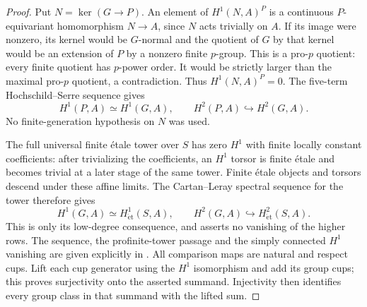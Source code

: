 \documentclass[11pt]{article}
\theoremstyle{definition}
\numberwithin{equation}{section}
\begin{document}
\begin{proof}
Put $N=\ker(G\to P)$. An element of $H^1(N,A)^P$ is a continuous
$P$-equivariant homomorphism $N\to A$, since $N$ acts trivially
on $A$. If its image were nonzero, its kernel would be $G$-normal
and the quotient of $G$ by that kernel would be an extension of
$P$ by a nonzero finite $p$-group. This is a pro-$p$ quotient:
every finite quotient has $p$-power order. It would be strictly
larger than the maximal pro-$p$ quotient, a contradiction.
Thus $H^1(N,A)^P=0$. The five-term Hochschild--Serre sequence gives
\begin{equation}
 H^1(P,A)\simeq H^1(G,A),\qquad
 H^2(P,A)\hookrightarrow H^2(G,A).
\end{equation}
No finite-generation hypothesis on $N$ was used.

The full universal finite \'etale tower over $S$ has zero $H^1$
with finite locally constant coefficients: after trivializing the
coefficients, an $H^1$ torsor is finite \'etale and becomes trivial
at a later stage of the same tower. Finite \'etale objects and
torsors descend under these affine limits. The Cartan--Leray
spectral sequence for the tower therefore gives
\begin{equation}
 H^1(G,A)\simeq H^1_{\mathrm{\acute et}}(S,A),\qquad
 H^2(G,A)\hookrightarrow H^2_{\mathrm{\acute et}}(S,A).
\end{equation}
This is only its low-degree consequence, and asserts no vanishing
of the higher rows. The sequence, the profinite-tower passage and
the simply connected $H^1$ vanishing are given explicitly in
\cite[Theorem~14.9, Remark~14.10, Example~14.11 and
Proposition~14.13, pp.~96--98]{MilneLEC2013}.
All comparison maps are natural and respect cups.
Lift each cup generator using the $H^1$ isomorphism and add its
group cups; this proves surjectivity onto the asserted summand.
Injectivity then identifies every group class in that summand with
the lifted sum.
\end{proof}
\end{document}
